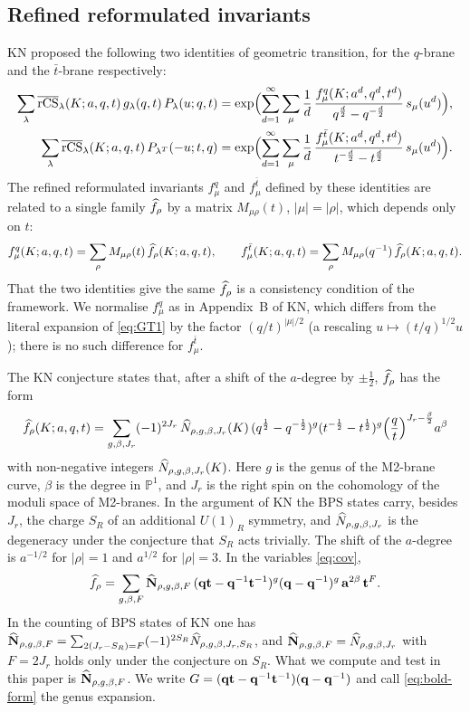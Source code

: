 \subsection{Refined reformulated invariants}
KN proposed the following two identities of geometric transition, for the $q$-brane and the $\bar t$-brane respectively:
\begin{align}
\sum_\lambda \overline{\mathrm{rCS}}_\lambda(K;a,q,t)\,g_\lambda(q,t)\,P_\lambda(u;q,t)
&=\exp\Bigl(\sum_{d=1}^\infty\sum_\mu \frac1d\,\frac{f^q_\mu(K;a^d,q^d,t^d)}{q^{\frac d2}-q^{-\frac d2}}\,s_\mu(u^d)\Bigr),\label{eq:GT1}\\
\sum_\lambda \overline{\mathrm{rCS}}_\lambda(K;a,q,t)\,P_{\lambda^T}(-u;t,q)
&=\exp\Bigl(\sum_{d=1}^\infty\sum_\mu \frac1d\,\frac{f^{\bar t}_\mu(K;a^d,q^d,t^d)}{t^{-\frac d2}-t^{\frac d2}}\,s_\mu(u^d)\Bigr).\label{eq:GT2}
\end{align}
The refined reformulated invariants $f^q_\mu$ and $f^{\bar t}_\mu$ defined by these identities are related to a single family $\widehat{f}_\rho$ by a matrix $M_{\mu\rho}(t)$, $|\mu|=|\rho|$, which depends only on $t$:
\begin{equation}\label{eq:f-to-hatf}
f^q_\mu(K;a,q,t)=\sum_\rho M_{\mu\rho}(t)\,\widehat{f}_\rho(K;a,q,t),\qquad f^{\bar t}_\mu(K;a,q,t)=\sum_\rho M_{\mu\rho}(q^{-1})\,\widehat{f}_\rho(K;a,q,t).
\end{equation}
That the two identities give the same $\widehat{f}_\rho$ is a consistency condition of the framework.
We normalise $f^q_\mu$ as in Appendix~B of KN, which differs from the literal expansion of \eqref{eq:GT1} by the factor $(q/t)^{|\mu|/2}$ (a rescaling $u\mapsto(t/q)^{1/2}u$); there is no such difference for $f^{\bar t}_\mu$.

The KN conjecture states that, after a shift of the $a$-degree by $\pm\frac12$, $\widehat{f}_\rho$ has the form
\begin{equation}\label{eq:hat-f-2}
\widehat{f}_\rho(K;a,q,t)=\sum_{g,\beta,J_r}(-1)^{2J_r}\,\widehat{N}_{\rho,g,\beta,J_r}(K)\,(q^{\frac12}-q^{-\frac12})^{g}(t^{-\frac12}-t^{\frac12})^{g}\Bigl(\frac qt\Bigr)^{J_r-\frac\beta2}a^{\beta}
\end{equation}
with non-negative integers $\widehat{N}_{\rho,g,\beta,J_r}(K)$.
Here $g$ is the genus of the M2-brane curve, $\beta$ is the degree in $\mathbb{P}^1$, and $J_r$ is the right spin on the cohomology of the moduli space of M2-branes.
In the argument of KN the BPS states carry, besides $J_r$, the charge $S_R$ of an additional $U(1)_R$ symmetry, and $\widehat{N}_{\rho,g,\beta,J_r}$ is the degeneracy under the conjecture that $S_R$ acts trivially.
The shift of the $a$-degree is $a^{-1/2}$ for $|\rho|=1$ and $a^{1/2}$ for $|\rho|=3$.
In the variables \eqref{eq:cov},
\begin{equation}\label{eq:bold-form}
\widehat{f}_\rho=\sum_{g,\beta,F}\widehat{\mathbf{N}}_{\rho,g,\beta,F}\,(\mathbf{q}\mathbf{t}-\mathbf{q}^{-1}\mathbf{t}^{-1})^{g}(\mathbf{q}-\mathbf{q}^{-1})^{g}\,\mathbf{a}^{2\beta}\,\mathbf{t}^{F} .
\end{equation}
In the counting of BPS states of KN one has $\widehat{\mathbf{N}}_{\rho,g,\beta,F}=\sum_{2(J_r-S_R)=F}(-1)^{2S_R}\widehat{N}_{\rho,g,\beta,J_r,S_R}$,
and $\widehat{\mathbf{N}}_{\rho,g,\beta,F}=\widehat{N}_{\rho,g,\beta,J_r}$ with $F=2J_r$ holds only under the conjecture on $S_R$.
What we compute and test in this paper is $\widehat{\mathbf{N}}_{\rho,g,\beta,F}$.
We write $G=(\mathbf{q}\mathbf{t}-\mathbf{q}^{-1}\mathbf{t}^{-1})(\mathbf{q}-\mathbf{q}^{-1})$ and call \eqref{eq:bold-form} the genus expansion.

